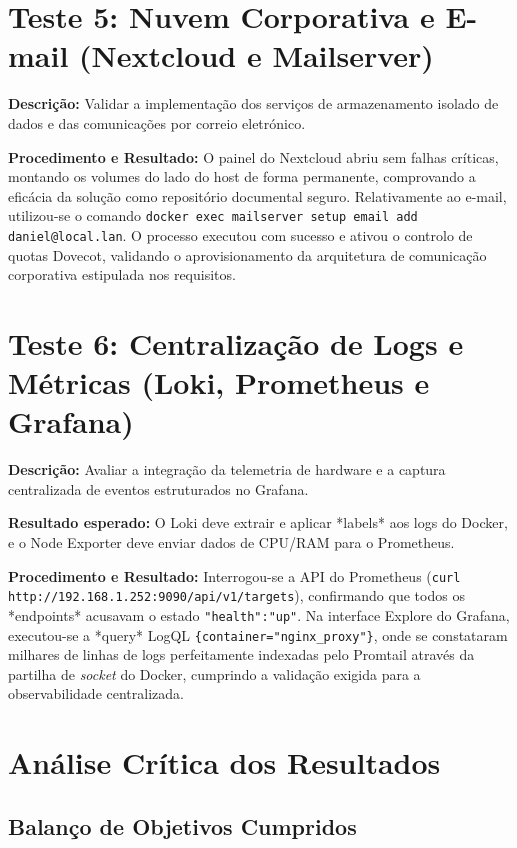 \section{Teste 5: Nuvem Corporativa e E-mail (Nextcloud e Mailserver)}

\textbf{Descrição:} Validar a implementação dos serviços de armazenamento isolado de dados e das comunicações por correio eletrónico.

\textbf{Procedimento e Resultado:} 
O painel do Nextcloud abriu sem falhas críticas, montando os volumes do lado do host de forma permanente, comprovando a eficácia da solução como repositório documental seguro. Relativamente ao e-mail, utilizou-se o comando \texttt{docker exec mailserver setup email add daniel@local.lan}. O processo executou com sucesso e ativou o controlo de quotas Dovecot, validando o aprovisionamento da arquitetura de comunicação corporativa estipulada nos requisitos.

\section{Teste 6: Centralização de Logs e Métricas (Loki, Prometheus e Grafana)}

\textbf{Descrição:} Avaliar a integração da telemetria de hardware e a captura centralizada de eventos estruturados no Grafana.

\textbf{Resultado esperado:} O Loki deve extrair e aplicar *labels* aos logs do Docker, e o Node Exporter deve enviar dados de CPU/RAM para o Prometheus.

\textbf{Procedimento e Resultado:} Interrogou-se a API do Prometheus (\texttt{curl http://192.168.1.252:9090/api/v1/targets}), confirmando que todos os *endpoints* acusavam o estado \texttt{"health":"up"}. Na interface Explore do Grafana, executou-se a *query* LogQL \texttt{\{container="nginx\_proxy"\}}, onde se constataram milhares de linhas de logs perfeitamente indexadas pelo Promtail através da partilha de \textit{socket} do Docker, cumprindo a validação exigida para a observabilidade centralizada.

\section{Análise Crítica dos Resultados}

\subsection{Balanço de Objetivos Cumpridos}

